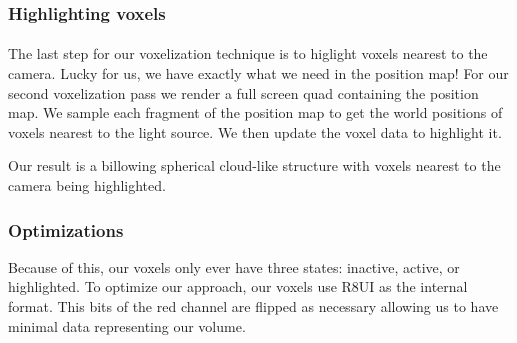 \subsubsection{Highlighting voxels}\paragraph{}
The last step for our voxelization technique is to higlight voxels nearest to the camera. Lucky for us, we have exactly what we need in the position map! 
For our second voxelization pass we render a full screen quad containing the position map. We sample each fragment of the position map to get the world positions of voxels nearest to the light source. We then update the voxel data to highlight it. 

Our result is a billowing spherical cloud-like structure with voxels nearest to the camera being highlighted. 


\subsubsection{Optimizations}
Because of this, our voxels only ever have three states: inactive, active, or highlighted. To optimize our approach, our voxels use R8UI as the internal format. This bits of the red channel are flipped as necessary allowing us to have minimal data representing our volume.

